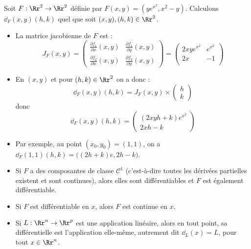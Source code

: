 \documentclass[12pt, class=report,crop=false]{standalone}
\begin{document}
\begin{exemple}
Soit $F : \Rr^2 \to \Rr^2$ définie par $F(x,y) = (ye^{x^2}, x^2-y)$.
Calculons $\dd_F (x,y)(h,k)$ quel que soit $(x,y), (h,k) \in \Rr^2$.

\begin{itemize}
  \item La matrice jacobienne de $F$ est :
$$J_F(x,y) = 
\begin{pmatrix}
\frac{\partial f_1}{\partial x} (x,y) & \frac{\partial f_1}{\partial y} (x,y) \\
\frac{\partial f_2}{\partial x} (x,y) & \frac{\partial f_2}{\partial y} (x,y)
\end{pmatrix}
= 
\begin{pmatrix}
2xye^{x^2} & e^{x^2} \\
2x & - 1 \\
\end{pmatrix}
$$  
  
  \item En $(x,y)$ et pour $(h,k) \in \Rr^2$ on a donc :
$$\dd_F(x,y) (h,k) = J_F(x,y) \times \begin{pmatrix} h \\ k \end{pmatrix}$$
donc 
$$\dd_F(x,y) (h,k) = \begin{pmatrix}
(2xyh +k)e^{x^2} \\
2xh-k
\end{pmatrix}$$

  \item Par exemple, au point $(x_0,y_0) = (1,1)$, on a
  $\dd_F (1,1) (h,k) = \big( (2h+k)e, 2h-k \big)$.
  

\end{itemize}
\end{exemple}


%

\begin{remarque*}
\sauteligne
\begin{itemize}

  \item Si $F$ a des composantes de classe $\mathcal{C}^1$ (c'est-à-dire toutes les dérivées partielles existent et sont continues), alors elles sont différentiables et $F$ est également différentiable.
  
  \item Si $F$ est différentiable en $x$, alors $F$ est continue en $x$.
  
  \item  Si $L : \Rr^n \to \Rr^p$ est une application linéaire, alors en tout point, sa
  différentielle est l'application elle-même, autrement dit  $\dd_L(x) = L$, pour tout $x \in \Rr^n$. 
\end{itemize}
\end{remarque*}  
 
\end{document}
